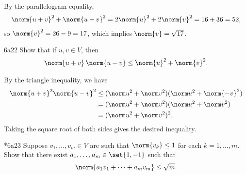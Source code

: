\begin{sol}
    By the parallelogram equality,
    \[
        \norm{u + v}^2 + \norm{u - v}^2 = 2\norm{u}^2 + 2\norm{v}^2 = 16 + 36 = 52,
    \]
    so $\norm{v}^2 = 26 - 9 = 17$, which implies $\norm{v} = \sqrt{17}$.
\end{sol}

\begin{exercise}{6a22}
    Show that if $u, v \in V$, then
    \[
        \norm{u + v}\, \norm{u - v} \leq \norm{u}^2 + \norm{v}^2.
    \]
\end{exercise}

\begin{sol}
    By the triangle inequality, we have
    \begin{align*}
        \norm{u + v}^2 \norm{u - v}^2 &\leq (\norm u^2 + \norm v^2)(\norm u^2 + \norm{-v}^2) \\
        &= (\norm u^2 + \norm v^2)(\norm u^2 + \norm v^2) \\
        &= (\norm u^2 + \norm v^2)^2.
    \end{align*}
    Taking the square root of both sides gives the desired inequality.
\end{sol}

\begin{exercise}*{6a23}
    Suppose $v_1, \ldots, v_m \in V$ are such that $\norm{v_k} \leq 1$ for each $k = 1, \ldots, m$.
    Show that there exist $a_1, \ldots, a_m \in \set{1, -1}$ such that
    \[
        \norm{a_1 v_1 + \cdots + a_m v_m} \leq \sqrt{m}.
    \]
\end{exercise}

